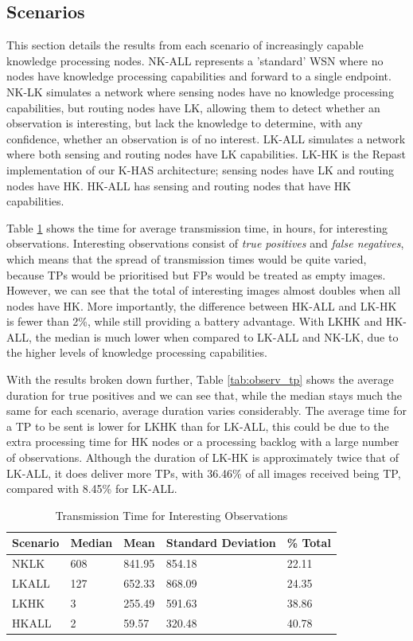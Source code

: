 \subsection{Scenarios}

This section details the results from each scenario of increasingly capable knowledge processing nodes. NK-ALL represents a 'standard' WSN where no nodes have knowledge processing capabilities and forward to a single endpoint. NK-LK simulates a network where sensing nodes have no knowledge processing capabilities, but routing nodes have LK, allowing them to detect whether an observation is interesting, but lack the knowledge to determine, with any confidence, whether an observation is of no interest. LK-ALL simulates a network where both sensing and routing nodes have LK capabilities. LK-HK is the Repast implementation of our K-HAS architecture; sensing nodes have LK and routing nodes have HK. HK-ALL has sensing and routing nodes that have HK capabilities. 

Table \ref{tab:observ_int} shows the time for average transmission time, in hours, for interesting observations. Interesting observations consist of \textit{true positives} and \textit{false negatives}, which means that the spread of transmission times would be quite varied, because TPs would be prioritised but FPs would be treated as empty images. However, we can see that the total of interesting images almost doubles when all nodes have HK. More importantly, the difference between HK-ALL and LK-HK is fewer than 2\%, while still providing a battery advantage. With LKHK and HK-ALL, the median is much lower when compared to LK-ALL and NK-LK, due to the higher levels of knowledge processing capabilities.

With the results broken down further, Table \ref{tab:observ_tp} shows the average duration for true positives and we can see that, while the median stays much the same for each scenario, average duration varies considerably. The average time for a TP to be sent is lower for LKHK than for LK-ALL, this could be due to the extra processing time for HK nodes or a processing backlog with a large number of observations. Although the duration of LK-HK is approximately twice that of LK-ALL, it does deliver more TPs, with 36.46\% of all images received being TP, compared with 8.45\% for LK-ALL.

\begin{table}[h]\footnotesize
\begin{tabularx}{\textwidth}{ |X|X|X|X|X|}
\hline
Scenario & Median & Mean & Standard Deviation & \% Total\\
\hline
NKLK & 608 & 841.95 & 854.18 & 22.11\\
LKALL & 127 & 652.33 & 868.09 & 24.35\\
LKHK & 3 & 255.49 & 591.63 & 38.86\\
HKALL & 2 & 59.57 & 320.48 & 40.78\\
\hline
\end{tabularx}
\caption{Transmission Time for Interesting Observations}\label{tab:observ_int}
\end{table}

